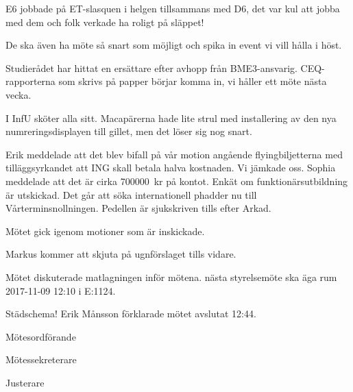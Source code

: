 \documentclass[10pt]{article}
\def\mo{Erik Månsson}
\def\ms{Johan Karlberg}
\def\ji{Daniel Bakic}
\begin{document}
\begin{paragrafer}
\begin{paragrafer}
E6 jobbade på ET-slasquen i helgen tillsammans med D6, det var kul att jobba med dem och folk verkade ha roligt på släppet!

De ska även ha möte så snart som möjligt och spika in event vi vill hålla i höst.

Studierådet har hittat en ersättare efter avhopp från BME3-ansvarig. CEQ-rapporterna som skrivs på papper börjar komma in, vi håller ett möte nästa vecka.

I InfU sköter alla sitt. Macapärerna hade lite strul med installering av den nya numreringsdisplayen till gillet, men det löser sig nog snart.

Erik meddelade att det blev bifall på vår motion angående flyingbiljetterna med tilläggsyrkandet att ING skall betala halva kostnaden. Vi jämkade oss.
Sophia meddelade att det är cirka \SI{700000}{kr} på kontot.
Enkät om funktionärsutbildning är utskickad. Det går att söka internationell phadder nu till Vårterminsnollningen. Pedellen är sjukskriven tills efter Arkad.
\end{paragrafer}

Mötet gick igenom motioner som är inskickade.

Markus kommer att skjuta på ugnförslaget tills vidare.

Mötet diskuterade matlagningen inför mötena.
{\Mba} nästa styrelsemöte ska äga rum 2017-11-09 12:10 i E:1124.

{\Ibfu}

Städschema!
{\mo} förklarade mötet avslutat 12:44.

\end{paragrafer}

\hidesignfoot
\begin{signatures}{3}
\signature{\mo}{Mötesordförande}
\signature{\ms}{Mötessekreterare}
\signature{\ji}{Justerare}
\end{signatures}
\end{document}
